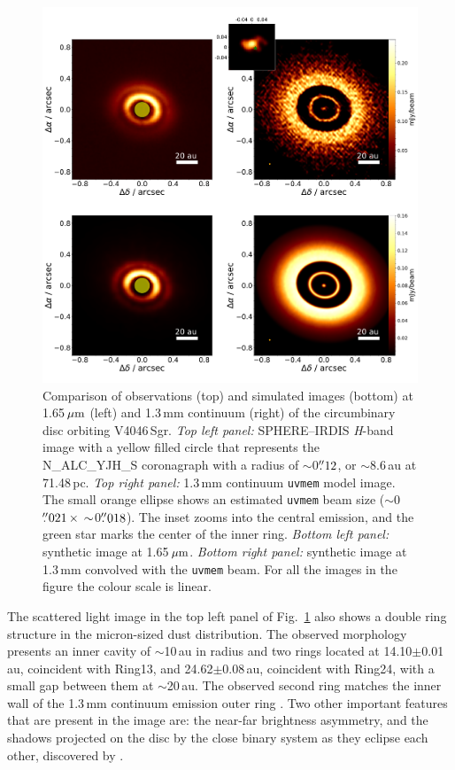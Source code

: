 \documentclass[fleqn,usenatbib,useAMS]{mnras}
\begin{document}
\begin{figure}
  \includegraphics[width=\textwidth]{hot_two_E.pdf}
  \caption{Comparison of observations (top) and simulated images (bottom) at 1.65\,$\hbox{$\mu$m}$ (left) and 1.3\,mm continuum (right) of the circumbinary disc orbiting V4046\,Sgr. \textit{Top left panel:} SPHERE--IRDIS \textit{H}-band image with a yellow filled circle that represents the N\_ALC\_YJH\_S coronagraph with a radius of $\sim$0$\hbox{$.\!\!^{\prime\prime}$}12$, or $\sim$8.6\,au at 71.48\,pc. \textit{Top right panel:} 1.3\,mm continuum {\tt uvmem} model image. The small orange ellipse shows an estimated {\tt uvmem} beam size ($\sim$0$\hbox{$.\!\!^{\prime\prime}$}021 \, \times \, \sim$0$\hbox{$.\!\!^{\prime\prime}$}018$). The inset zooms into the central emission, and the green star marks the center of the inner ring. \textit{Bottom left panel:} synthetic image at 1.65\,$\hbox{$\mu$m}$. \textit{Bottom right panel:} synthetic image at 1.3\,mm convolved with the {\tt uvmem} beam. For all the images in the figure the colour scale is linear.}
  \label{fig:images_vs_simulated}
\end{figure}

The scattered light image in the top left panel of Fig.~\ref{fig:images_vs_simulated} also shows a double ring structure in the micron-sized dust distribution. The observed morphology presents an inner cavity of $\sim$10\,au in radius and two rings located at 14.10$\pm$0.01\,au, coincident with Ring13, and 24.62$\pm$0.08\,au, coincident with Ring24, with a small gap between them at $\sim$20\,au. The observed second ring matches the inner wall of the 1.3\,mm continuum emission outer ring \citep{Ru_z_Rodr_guez_2019}. Two other important features that are present in the image are: the near-far brightness asymmetry, and the shadows projected on the disc by the close binary system as they eclipse each other, discovered by \citet{dOrazi}.
\end{document}
